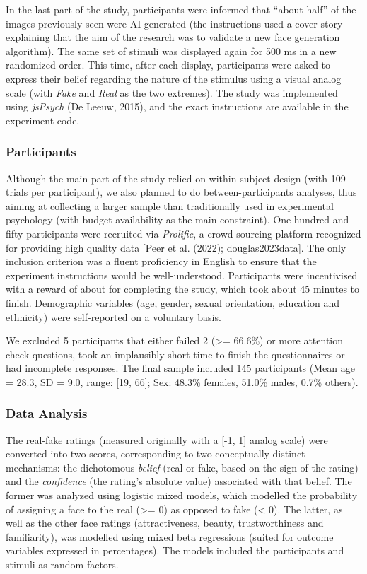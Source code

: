 \documentclass[
  man,floatsintext]{apa6}
\begin{document}
In the last part of the study, participants were informed that ``about half'' of the images previously seen were AI-generated (the instructions used a cover story explaining that the aim of the research was to validate a new face generation algorithm). The same set of stimuli was displayed again for 500 ms in a new randomized order. This time, after each display, participants were asked to express their belief regarding the nature of the stimulus using a visual analog scale (with \emph{Fake} and \emph{Real} as the two extremes). The study was implemented using \emph{jsPsych} (De Leeuw, 2015), and the exact instructions are available in the experiment code.

\hypertarget{participants}{%
\subsubsection{Participants}\label{participants}}

Although the main part of the study relied on within-subject design (with 109 trials per participant), we also planned to do between-participants analyses, thus aiming at collecting a larger sample than traditionally used in experimental psychology (with budget availability as the main constraint). One hundred and fifty participants were recruited via \emph{Prolific}, a crowd-sourcing platform recognized for providing high quality data {[}Peer et al. (2022); douglas2023data{]}. The only inclusion criterion was a fluent proficiency in English to ensure that the experiment instructions would be well-understood. Participants were incentivised with a reward of about  for completing the study, which took about 45 minutes to finish. Demographic variables (age, gender, sexual orientation, education and ethnicity) were self-reported on a voluntary basis.

We excluded 5 participants that either failed 2 (\textgreater= 66.6\%) or more attention check questions, took an implausibly short time to finish the questionnaires or had incomplete responses. The final sample included 145 participants (Mean age = 28.3, SD = 9.0, range: {[}19, 66{]}; Sex: 48.3\% females, 51.0\% males, 0.7\% others).

\hypertarget{data-analysis}{%
\subsubsection{Data Analysis}\label{data-analysis}}

The real-fake ratings (measured originally with a {[}-1, 1{]} analog scale) were converted into two scores, corresponding to two conceptually distinct mechanisms: the dichotomous \emph{belief} (real or fake, based on the sign of the rating) and the \emph{confidence} (the rating's absolute value) associated with that belief. The former was analyzed using logistic mixed models, which modelled the probability of assigning a face to the real (\textgreater= 0) as opposed to fake (\textless{} 0). The latter, as well as the other face ratings (attractiveness, beauty, trustworthiness and familiarity), was modelled using mixed beta regressions (suited for outcome variables expressed in percentages). The models included the participants and stimuli as random factors.
\end{document}
